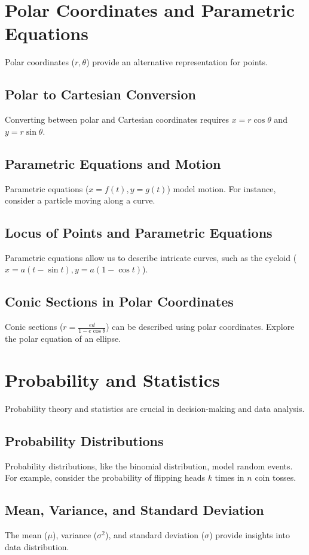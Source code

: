 \documentclass{article}
\begin{document}
\section{Polar Coordinates and Parametric Equations}
Polar coordinates (\(r, \theta\)) provide an alternative representation for points.

\subsection{Polar to Cartesian Conversion}
Converting between polar and Cartesian coordinates requires \(x = r \cos \theta\) and \(y = r \sin \theta\).

\subsection{Parametric Equations and Motion}
Parametric equations (\(x = f(t), y = g(t)\)) model motion. For instance, consider a particle moving along a curve.

\subsection{Locus of Points and Parametric Equations}
Parametric equations allow us to describe intricate curves, such as the cycloid (\(x = a(t - \sin t), y = a(1 - \cos t)\)).

\subsection{Conic Sections in Polar Coordinates}
Conic sections (\(r = \frac{ed}{1 - e \cos \theta}\)) can be described using polar coordinates. Explore the polar equation of an ellipse.

\section{Probability and Statistics}
Probability theory and statistics are crucial in decision-making and data analysis.

\subsection{Probability Distributions}
Probability distributions, like the binomial distribution, model random events. For example, consider the probability of flipping heads \(k\) times in \(n\) coin tosses.

\subsection{Mean, Variance, and Standard Deviation}
The mean (\(\mu\)), variance (\(\sigma^2\)), and standard deviation (\(\sigma\)) provide insights into data distribution.
\end{document}
